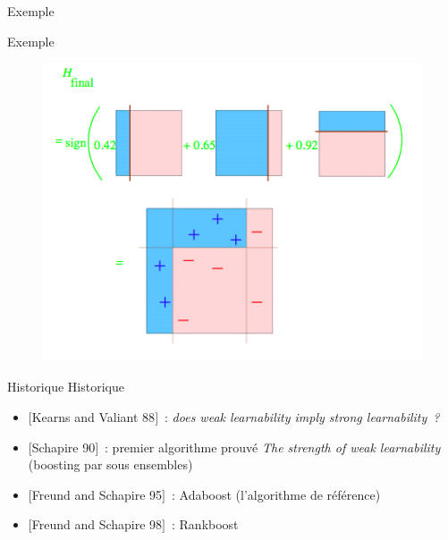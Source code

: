 \documentclass{beamer}
\begin{document}
\begin{frame}{Exemple}
\begin{figure}
        \pause {}
    \end{figure}    
\end{frame}

\begin{frame}{Exemple}
    \begin{figure}
        \centering
        \includegraphics[width=0.5\linewidth]{fig/6}
    \end{figure}    
\end{frame}

\begin{frame}{Historique}
    Historique
    \begin{itemize}
        \item $[$Kearns and Valiant 88$]$~: \emph{does weak learnability
              imply strong learnability~?}
        \item $[$Schapire 90$]$~: premier algorithme prouvé \emph{The strength
              of weak learnability} (boosting par sous ensembles)
        \item $[$Freund and Schapire 95$]$~: Adaboost (l'algorithme de
              référence)
        \item $[$Freund and Schapire 98$]$~: Rankboost
    \end{itemize}
\end{frame}
\end{document}

